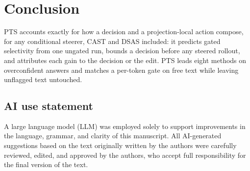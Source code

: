 \documentclass{article}
\begin{document}
\section{Conclusion}

PTS accounts exactly for how a decision and a projection-local action
compose, for any conditional steerer, CAST and DSAS included: it predicts
gated selectivity from one ungated run, bounds a decision before any steered
rollout, and attributes each gain to the decision or the edit. PTS leads
eight methods on overconfident answers and matches a per-token gate on free
text while leaving unflagged text untouched.
\subsection*{AI use statement}

A large language model (LLM) was employed solely to support improvements in the
language, grammar, and clarity of this manuscript. All AI-generated suggestions
based on the text originally written by the authors were carefully reviewed,
edited, and approved by the authors, who accept full responsibility for the
final version of the text.
\end{document}
